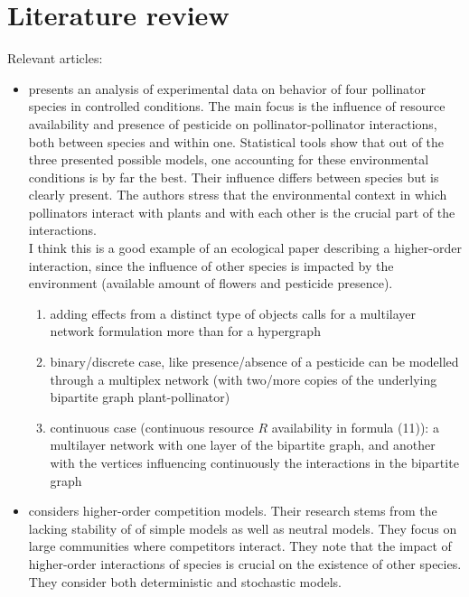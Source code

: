 \section{Literature review}
Relevant articles:
\begin{itemize}

\item \cite{Cervantes_2021} presents an analysis of experimental data on behavior of four pollinator species in controlled conditions. The main focus is the influence of resource availability and presence of pesticide on pollinator-pollinator interactions, both between species and within one. Statistical tools show that out of the three presented possible models, one accounting for these environmental conditions is by far the best. Their influence differs between species but is clearly present. The authors stress that the environmental context in which pollinators interact with plants and with each other is the crucial part of the interactions. \\
I think this is a good example of an ecological paper describing a higher-order interaction, since the influence of other species is impacted by the environment (available amount of flowers and pesticide presence).
\begin{enumerate}
    \item adding effects from a distinct type of objects calls for a multilayer network formulation more than for a hypergraph 
    \item binary/discrete case, like presence/absence of a pesticide can be modelled through a multiplex network (with two/more copies of the underlying bipartite graph plant-pollinator)
    \item continuous case (continuous resource $R$ availability in formula (11)): a multilayer network with one layer of the bipartite graph, and another with the vertices influencing continuously the interactions in the bipartite graph
\end{enumerate}

\item \cite{Grilli2017} considers higher-order competition models. Their research stems from the lacking stability of of simple models as well as neutral models. They focus on large communities where competitors interact. They note that the impact of higher-order interactions of species is crucial on the existence of other species. They consider both deterministic and stochastic models.


\end{itemize}
